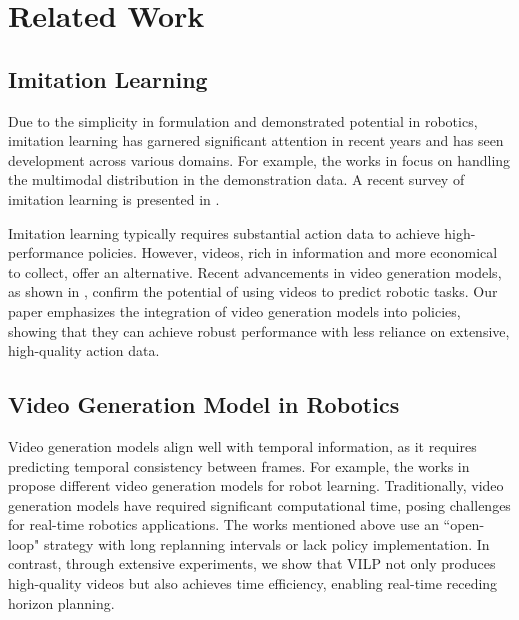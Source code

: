 \section{Related Work}
\label{sec:related_work}
\subsection{Imitation Learning}
Due to the simplicity in formulation and demonstrated potential in robotics, imitation learning has garnered significant attention in recent years and has seen development across various domains. For example, the works in \cite{florence2022implicit,chi2023diffusionpolicy,lee2024behavior} focus on handling the multimodal distribution in the demonstration data. A recent survey of imitation learning is presented in \cite{urain2024deep}.


Imitation learning typically requires substantial action data to achieve high-performance policies. However, videos, rich in information and more economical to collect, offer an alternative. Recent advancements in video generation models, as shown in \cite{brooks2024video}, confirm the potential of using videos to predict robotic tasks. Our paper emphasizes the integration of video generation models into policies, showing that they can achieve robust performance with less reliance on extensive, high-quality action data.

\subsection{Video Generation Model in Robotics}
Video generation models align well with temporal information, as it requires predicting temporal consistency between frames. For example, the works in \cite{du2023video,du2024learning,Ko2023Learning,yang2023learning,gu2023seer,liang2024dreamitate} propose different video generation models for robot learning. Traditionally, video generation models have required significant computational time, posing challenges for real-time robotics applications. The works mentioned above use an  ``open-loop" strategy with long replanning intervals or lack policy implementation. In contrast, through extensive experiments, we show that VILP not only produces high-quality videos but also achieves time efficiency, enabling real-time receding horizon planning.